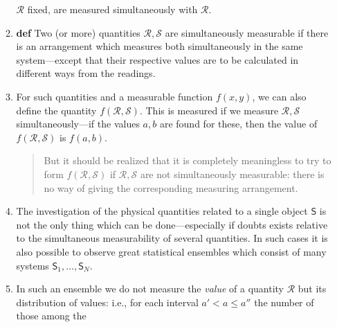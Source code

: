 \documentclass[a4paper]{article}
\theoremstyle{definition}
\theoremstyle{plain}
\begin{document}
\begin{enumerate}
\begin{enumerate}
                    $\mathcal{R}$ fixed, are measured
                    simultaneously with $\mathcal{R}$.
                \item \textbf{def} Two (or more) quantities
                    $\mathcal{R}, \mathcal{S}$ are
                    simultaneously measurable if there is an
                    arrangement which measures both
                    simultaneously in the same
                    system---except that their respective
                    values are to be calculated in different
                    ways from the readings.
                \item For such quantities and a measurable
                    function $f(x,y)$, we can also define
                    the quantity
                    $f(\mathcal{R},\mathcal{S})$. This is
                    measured if we measure
                    $\mathcal{R},\mathcal{S}$ 
                    simultaneously---if the values $a,b$ are
                    found for these, then the value of
                    $f(\mathcal{R},\mathcal{S})$ is
                    $f(a,b)$. 
                    \begin{quote}
                        But it should be realized that it is
                        completely meaningless to try to
                        form $f(\mathcal{R},\mathcal{S})$ if
                        $\mathcal{R},\mathcal{S}$ are not
                        simultaneously measurable: there is
                        no way of giving the corresponding
                        measuring arrangement.
                    \end{quote}
                \item The investigation of the physical
                    quantities related to a single object
                    $\mathsf{S}$ is not the only thing which
                    can be done---especially if doubts
                    exists relative to the simultaneous
                    measurability of several quantities. In
                    such cases it is also possible to
                    observe great statistical ensembles
                    which consist of many systems
                    $\mathsf{S}_1,\ldots,\mathsf{S}_N$. 
                \item In such an ensemble we do not measure
                    the \textit{value} of a quantity
                    $\mathcal{R}$ but its distribution of
                    values: i.e., for each interval $a' < a
                    \leq a''$ the number of those among the

\end{enumerate}
\end{enumerate}
\end{document}
